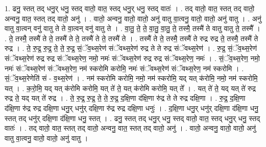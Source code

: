 \documentclass[17pt]{extarticle}
\begin{document}
1. ढनु॒ स्तत् तद् धनु॒र् धनु॒ स्तद् वातो॒ वात॒ स्तद् धनु॒र् धनु॒ स्तद् वातः॑ । . तद् वातो॒ वात॒ स्तत् तद् वातो॒ अन्वनु॒ वात॒ स्तत् तद् वातो॒ अनु॑ । . वातो॒ अन्वनु॒ वातो॒ वातो॒ अनु॑ वातु वा॒त्वनु॒ वातो॒ वातो॒ अनु॑ वातु । . अनु॑ वातु वा॒त्वन् वनु॑ वातु ते ते वा॒त्वन् वनु॑ वातु ते । . वा॒तु॒ ते॒ ते॒ वा॒तु॒ वा॒तु॒ ते॒ तस्मै॒ तस्मै॑ ते वातु वातु ते॒ तस्मै᳚ । . ते॒ तस्मै॒ तस्मै॑ ते ते॒ तस्मै॑ ते ते॒ तस्मै॑ ते ते॒ तस्मै॑ ते । . तस्मै॑ ते ते॒ तस्मै॒ तस्मै॑ ते रुद्र रुद्र ते॒ तस्मै॒ तस्मै॑ ते रुद्र । . ते॒ रु॒द्र॒ रु॒द्र॒ ते॒ ते॒ रु॒द्र॒ सं॒ॅव॒थ्स॒रेण॑ संॅवथ्स॒रेण॑ रुद्र ते ते रुद्र संॅवथ्स॒रेण॑ । . रु॒द्र॒ सं॒ॅव॒थ्स॒रेण॑ संॅवथ्स॒रेण॑ रुद्र रुद्र संॅवथ्स॒रेण॒ नमो॒ नमः॑ संॅवथ्स॒रेण॑ रुद्र रुद्र संॅवथ्स॒रेण॒ नमः॑ । . सं॒ॅव॒थ्स॒रेण॒ नमो॒ नमः॑ संॅवथ्स॒रेण॑ संॅवथ्स॒रेण॒ नम॑ स्करोमि करोमि॒ नमः॑ संॅवथ्स॒रेण॑ संॅवथ्स॒रेण॒ नम॑ स्करोमि । . सं॒ॅव॒थ्स॒रेणेति॑ सं - व॒थ्स॒रेण॑ । . नम॑ स्करोमि करोमि॒ नमो॒ नम॑ स्करोमि॒ यद् यत् क॑रोमि॒ नमो॒ नम॑ स्करोमि॒ यत् । . क॒रो॒मि॒ यद् यत् क॑रोमि करोमि॒ यत् ते॑ ते॒ यत् क॑रोमि करोमि॒ यत् ते᳚ । . यत् ते॑ ते॒ यद् यत् ते॑ रुद्र रुद्र ते॒ यद् यत् ते॑ रुद्र । . ते॒ रु॒द्र॒ रु॒द्र॒ ते॒ ते॒ रु॒द्र॒ द॒क्षि॒णा द॑क्षि॒णा रु॑द्र ते ते रुद्र दक्षि॒णा । . रु॒द्र॒ द॒क्षि॒णा द॑क्षि॒णा रु॑द्र रुद्र दक्षि॒णा धनु॒र् धनु॑र् दक्षि॒णा रु॑द्र रुद्र दक्षि॒णा धनुः॑ । . द॒क्षि॒णा धनु॒र् धनु॑र् दक्षि॒णा द॑क्षि॒णा धनु॒ स्तत् तद् धनु॑र् दक्षि॒णा द॑क्षि॒णा धनु॒ स्तत् । . ढनु॒ स्तत् तद् धनु॒र् धनु॒ स्तद् वातो॒ वात॒ स्तद् धनु॒र् धनु॒ स्तद् वातः॑ । . तद् वातो॒ वात॒ स्तत् तद् वातो॒ अन्वनु॒ वात॒ स्तत् तद् वातो॒ अनु॑ । . वातो॒ अन्वनु॒ वातो॒ वातो॒ अनु॑ वातु वा॒त्वनु॒ वातो॒ वातो॒ अनु॑ वातु । \newline
\end{document}
